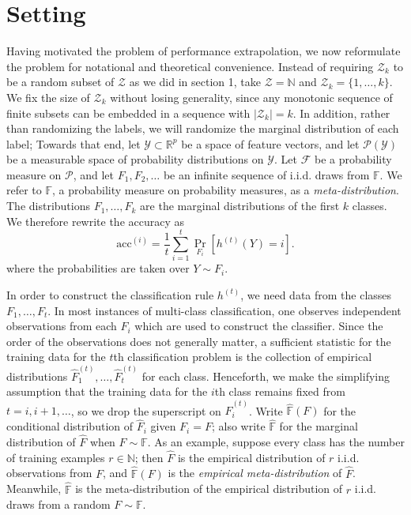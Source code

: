 \documentclass{article}
\begin{document}
\section{Setting}

Having motivated the problem of performance extrapolation,
we now reformulate the problem for notational and theoretical convenience.
Instead of requiring $\mathcal{Z}_k$ to be a random subset of $\mathcal{Z}$ as we did in section 1, take
$\mathcal{Z}=\mathbb{N}$ and $\mathcal{Z}_k = \{1,\hdots, k\}$.
We fix the size of $\mathcal{Z}_k$ without losing generality, since any monotonic sequence of 
finite subsets can be embedded in a sequence with $|\mathcal{Z}_k| = k$.
In addition, rather than randomizing the labels, we will randomize the marginal distribution of each label;
Towards that end, let $\mathcal{Y} \subset \mathbb{R}^p$ be a space of feature vectors, and
let $\mathcal{P}(\mathcal{Y})$ be a measurable space of probability distributions on $\mathcal{Y}$.
Let $\mathcal{F}$ be a probability measure on $\mathcal{P}$,
and let $F_1, F_2,\hdots$ be an infinite sequence of i.i.d. draws from $\mathbb{F}$.
We refer to $\mathbb{F}$, a probability measure on probability measures, as a \emph{meta-distribution}.
The distributions $F_1,\hdots, F_k$ are the marginal distributions of the first $k$ classes.
We therefore rewrite the accuracy as
\[
\text{acc}^{(i)} = \frac{1}{t}\sum_{i=1}^t \Pr_{F_i}[h^{(t)}(Y) = i].
\]
where the probabilities are taken over $Y \sim F_i$.

In order to construct the classification rule $h^{(t)}$, we need data from the classes $F_1,\hdots, F_t$.
In most instances of multi-class classification, one observes independent observations from each $F_i$
which are used to construct the classifier.  Since the order of the observations
does not generally matter, a sufficient statistic for the training data for the $t$th classification problem
is the collection of empirical distributions
$\hat{F}_1^{(t)},\hdots,\hat{F}_t^{(t)}$ for each class.
Henceforth, we make the simplifying assumption that the training data for the $i$th class remains fixed
from $t =i, i+1,\hdots$, so we drop the superscript on $\hat{F}_i^{(t)}$.
Write $\hat{\mathbb{F}}(F)$ for the conditional distribution of $\hat{F}_i$ given  $F_i = F$;
also write $\hat{\mathbb{F}}$ for the marginal distribution of $\hat{F}$ when $F \sim \mathbb{F}.$
As an example, suppose every class has the number of training examples $r \in \mathbb{N}$; then $\hat{F}$
is the empirical distribution of $r$ i.i.d. observations from $F$, and $\hat{\mathbb{F}}(F)$ is the \emph{empirical meta-distribution} of $\hat{F}$.
Meanwhile, $\hat{\mathbb{F}}$ is the meta-distribution of the empirical distribution of $r$ i.i.d. draws from a random $F \sim \mathbb{F}$.
\end{document}

